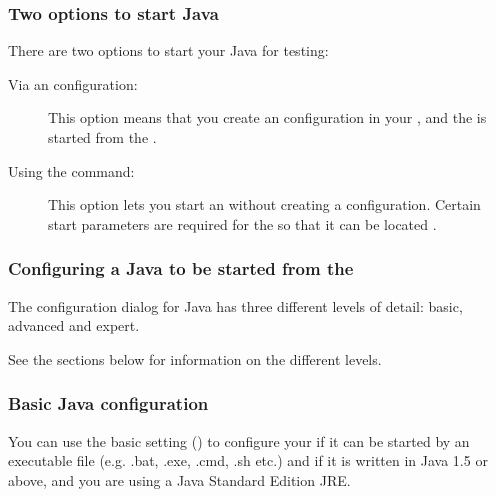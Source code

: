 \subsubsection{Two options to start Java \gdauts{}}

There are two options to start your Java \gdaut{} for testing:

\begin{description}
\item [Via an \gdaut{} configuration:]{This option means that you create an \gdaut{} configuration in your \gdproject{}, and the \gdaut{} is started from the \ite{} .}
\item [Using the  command:]{This option lets you start an \gdaut{} without creating a configuration. Certain start parameters are required for the \gdaut{} so that it can be located .}
\end{description}


\subsubsection{Configuring a Java \gdaut{} to be started from the \ite{}}
\label{TasksConfigureJavaAUT}

The \gdaut{} configuration dialog for Java has three different levels of detail: basic, advanced and expert. 

See the sections below for information on the different levels. 

\subsubsection{Basic Java \gdaut{} configuration}

You can use the basic setting () to configure your \gdaut{} if it can be started by an executable file (e.g. .bat, .exe, .cmd, .sh etc.) and if it is written in Java 1.5 or above, and you are using a Java Standard Edition JRE. 

